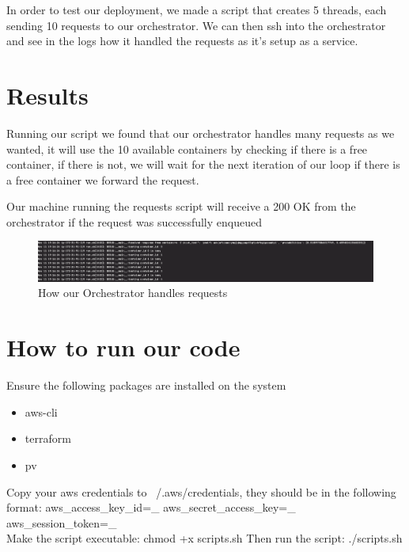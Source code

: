 \documentclass[11pt]{article}
\begin{document}
In order to test our deployment, we made a script that creates 5 threads, each sending 10 requests to our orchestrator. We can then ssh into the orchestrator and see in the logs how it handled the requests as it's setup as a service.


\section{Results}
Running our script we found that our orchestrator handles many requests as we wanted, it will use the 10 available containers by checking if there is a free container, if there is not, we will wait for the next iteration of our loop if there is a free container we forward the request.

Our machine running the requests script will receive a 200 OK from the orchestrator if the request was successfully enqueued


\begin{figure}[ht]
  \centering
  \includegraphics[width=\textwidth]{images/container_busy}
  \caption{How our Orchestrator handles requests}
  \label{fig:container_busy}
\end{figure}

\section{How to run our code}
Ensure the following packages are installed on the system
\begin{itemize}
	\item aws-cli
	\item terraform
	\item pv
\end{itemize}
\newline
Copy your aws credentials to ~/.aws/credentials, they should be in the following format:
\newline
[default] \newline
aws\_access\_key\_id=\_ \newline
aws\_secret\_access\_key=\_ \newline
aws\_session\_token=\_
\newline
\\
Make the script executable: chmod +x scripts.sh \newline
Then run the script: ./scripts.sh
\end{document}
